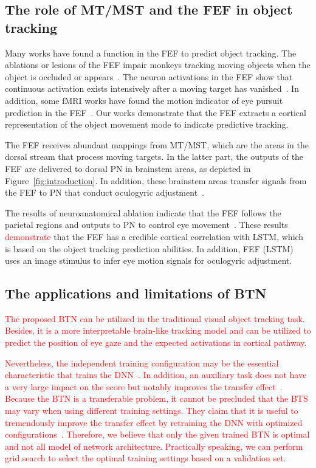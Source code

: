 \documentclass[final,3p,times,twocolumn]{elsarticle}
\begin{document}
\subsection{The role of MT/MST and the FEF in object tracking}
Many works have found a function in the FEF to predict  object tracking. 
The ablations or lesions of the FEF impair monkeys tracking moving objects when the object is occluded or appears~\cite{b11}. 
The neuron activations in the FEF show that continuous activation exists intensively after a moving target has vanished~\cite{b14}. 
In addition, some fMRI works have found the motion indicator of eye  pursuit prediction in the FEF~\cite{b33}. 
Our works demonstrate that the FEF extracts a cortical representation of the object movement mode to indicate predictive tracking.

The FEF receives abundant mappings from MT/MST, which are the areas in the dorsal stream that process moving targets. 
In the latter part, the outputs of the FEF are delivered to dorsal PN in brainstem areas, as depicted in Figure~\ref{fig:introduction}. 
In addition, these brainstem areas transfer signals from the FEF to PN that conduct oculogyric adjustment~\cite{b36}.

The results of neuroanatomical ablation indicate that the FEF follows the parietal regions and outputs to PN to control eye movement~\cite{b11}. 
These results \textcolor{red}{demonstrate} that the FEF has a credible cortical correlation with LSTM, which is based on the object tracking prediction abilities. 
In addition, FEF (LSTM) uses an image stimulus to infer eye motion signals for oculogyric adjustment. 

\subsection{The applications and limitations of BTN}
\textcolor{red}{
The proposed BTN can be utilized in the traditional visual object tracking task.
Besides, it is a more interpretable brain-like tracking model and can be utilized to predict the position of eye gaze and the expected activations in cortical pathway.
}

\textcolor{red}{
Nevertheless, the independent training configuration may be the essential characteristic that trains the DNN~\cite{Kornblith2018a}. 
In addition, an auxiliary task does not have a very large impact on the score but notably improves the transfer effect~\cite{Kornblith2018a}.
Because the BTN is a transferable problem, it cannot be precluded that the BTS may vary when using different training settings.  
They claim that it is useful to tremendously improve the transfer effect by retraining the DNN with optimized configurations~\cite{Kornblith2018a}. 
Therefore, we believe that only the given trained BTN is optimal and not all model of network architecture. 
Practically speaking, we can perform grid search to select the optimal training settings based on a validation set.
}
\end{document}
